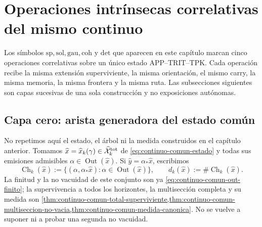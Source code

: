 \chapter{Operaciones intrínsecas correlativas del mismo continuo}
\label{chap:pdfv2-operaciones-intrinsecas-correlativas}

\begin{thesisbox}
Los símbolos \(\mathrm{sp},\mathrm{sol},\mathrm{gau},\mathrm{coh}\) y
\(\mathrm{det}\) que aparecen en este capítulo marcan cinco operaciones
correlativas sobre un único estado APP--TRIT--TPK\@. Cada operación recibe
la misma extensión superviviente, la
misma orientación, el mismo carry, la misma memoria, la misma frontera y la
misma ruta. Las subsecciones siguientes son capas sucesivas de una sola
construcción y no exposiciones autónomas.
\end{thesisbox}

\section{Capa cero: arista generadora del estado común}

No repetimos aquí el estado, el árbol ni la medida construidos en el capítulo
anterior. Tomamos
\(\widehat x=\widehat x_k(\gamma)\in
\widehat{\mathcal X}^{\rm tot}_k\) de
\eqref{eq:continuo-comun-estado} y todas sus emisiones admisibles
\(\alpha\in\operatorname{Out}(\widehat x)\). Si
\(\widehat y=\alpha_*\widehat x\), escribimos
\begin{equation}
\label{eq:pdfv2-cor-hijos-supervivientes}
 \operatorname{Ch}_k(\widehat x):=
 \{(\alpha,\alpha_*\widehat x):
      \alpha\in\operatorname{Out}(\widehat x)\},
 \qquad
 d_k(\widehat x):=\#\operatorname{Ch}_k(\widehat x).
\end{equation}
La finitud y la no vacuidad de este conjunto son ya
\eqref{eq:continuo-comun-out-finito}; la supervivencia a todos los horizontes,
la multisección completa y su medida son
\cref{thm:continuo-comun-total-superviviente,thm:continuo-comun-multiseccion-no-vacia,thm:continuo-comun-medida-canonica}. No se vuelve a suponer ni a probar una
segunda no vacuidad.

